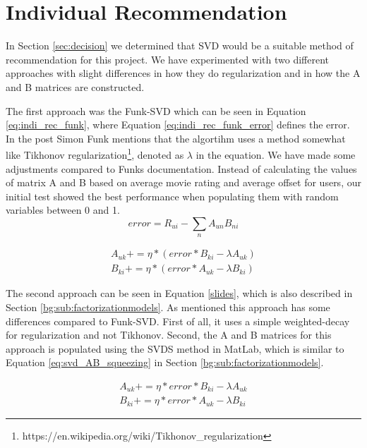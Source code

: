 \section{Individual Recommendation}\label{sec:individual_recommendation}
In Section \ref{sec:decision} we determined that SVD would be a suitable method of recommendation for this project. 
We have experimented with two different approaches with slight differences in how they do regularization and in how the A and B matrices are constructed.

The first approach was the Funk-SVD which can be seen in Equation \ref{eq:indi_rec_funk}, where Equation \ref{eq:indi_rec_funk_error} defines the error\cite{svdsimonfunk}. In the post Simon Funk mentions that the algortihm uses a method somewhat like Tikhonov regularization\footnote{https://en.wikipedia.org/wiki/Tikhonov_regularization}, denoted as $\lambda$ in the equation. We have made some adjustments compared to Funks documentation\cite{svdsimonfunk}. Instead of calculating the values of matrix A and B based on average movie rating and average offset for users, our initial test showed the best performance when populating them with random variables between 0 and 1.
\begin{equation}\label{eq:indi_rec_funk_error}
error = R_{ui} - \sum_n A_{un}B_{ni}
\end{equation}

\begin{equation}\label{eq:indi_rec_funk}
\begin{aligned}
A_{uk} += \eta * (error * B_{ki} - \lambda A_{uk}) \\
B_{ki} += \eta * (error * A_{uk} - \lambda B_{ki})
\end{aligned}
\end{equation}

The second approach can be seen in Equation \ref{slides}, which is also described in Section \ref{bg:sub:factorizationmodels}. As mentioned this approach has some differences compared to Funk-SVD. First of all, it uses a simple weighted-decay for regularization and not Tikhonov. Second, the A and B matrices for this approach is populated using the SVDS method in MatLab, which is similar to Equation \ref{eq:svd_AB_squeezing} in Section \ref{bg:sub:factorizationmodels}.

\begin{equation}\label{slides}
\begin{aligned}
A_{uk} += \eta * error *B_{ki} - \lambda A_{uk} \\
B_{ki} += \eta * error *A_{uk} - \lambda B_{ki} 
\end{aligned}
\end{equation}

